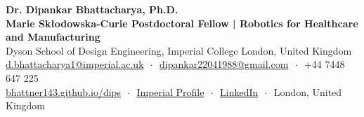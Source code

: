 \documentclass[11pt,a4paper]{article}
\newcommand{\makerubric}[1]{}
\begin{document}
\begin{center}
  {\Huge\bfseries\sffamily\color{accent} Dr. Dipankar Bhattacharya, Ph.D.}\\[0.4em]
  {\large\bfseries Marie Sk\l{}odowska-Curie Postdoctoral Fellow | Robotics for Healthcare and Manufacturing}\\
  Dyson School of Design Engineering, Imperial College London, United Kingdom\\[0.7em]
  \small
  \href{mailto:d.bhattacharya1@imperial.ac.uk}{d.bhattacharya1@imperial.ac.uk} $\,\cdot\,$
  \href{mailto:dipankar22041988@gmail.com}{dipankar22041988@gmail.com} $\,\cdot\,$
  +44 7448 647 225\\
  \href{https://bhattner143.github.io/dips/}{bhattner143.github.io/dips} $\,\cdot\,$
  \href{https://profiles.imperial.ac.uk/d.bhattacharya1/about}{Imperial Profile} $\,\cdot\,$
  \href{https://www.linkedin.com/in/dipankar-bhattacharya-phd-imperial}{LinkedIn} $\,\cdot\,$
  London, United Kingdom
\end{center}

\vspace{0.35em}


\makerubric{highlights}
\makerubric{grants}
\makerubric{employment}

\makerubric{academic}
\makerubric{teaching}
\makerubric{education}
\makerubric{skills}
\end{document}
